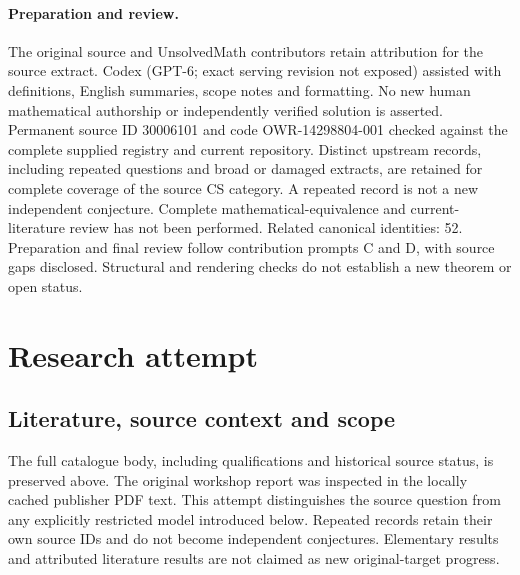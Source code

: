 \documentclass[11pt]{article}
\begin{document}
\paragraph{Preparation and review.}
The original source and UnsolvedMath contributors retain attribution for the source extract. Codex (GPT-6; exact serving revision not exposed) assisted with definitions, English summaries, scope notes and formatting. No new human mathematical authorship or independently verified solution is asserted. Permanent source ID 30006101 and code OWR-14298804-001 checked against the complete supplied registry and current repository. Distinct upstream records, including repeated questions and broad or damaged extracts, are retained for complete coverage of the source CS category. A repeated record is not a new independent conjecture. Complete mathematical-equivalence and current-literature review has not been performed. Related canonical identities: 52. Preparation and final review follow contribution prompts C and D, with source gaps disclosed. Structural and rendering checks do not establish a new theorem or open status.
\label{end:30006101}

\section{Research attempt}
\subsection{Literature, source context and scope}
The full catalogue body, including qualifications and historical source status, is preserved above. The original workshop report was inspected in the locally cached publisher PDF text. This attempt distinguishes the source question from any explicitly restricted model introduced below. Repeated records retain their own source IDs and do not become independent conjectures. Elementary results and attributed literature results are not claimed as new original-target progress.
\end{document}
